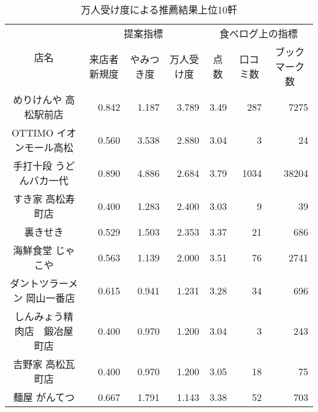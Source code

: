 \begin{table}[H]
\centering
\caption{万人受け度による推薦結果上位10軒}
\label{table:scrutiny:acceptability}
\small
\begin{tabular}{|c|r|r|r|r|r|r|}
\hline
\multirow{2}{*}{店名} & \multicolumn{3}{c|}{提案指標} & \multicolumn{3}{c|}{食べログ上の指標} \\ \cline{2-7} 
 & \multicolumn{1}{c|}{来店者新規度} & \multicolumn{1}{c|}{やみつき度} & \multicolumn{1}{c|}{万人受け度} & \multicolumn{1}{c|}{点数} & \multicolumn{1}{c|}{口コミ数} & \multicolumn{1}{c|}{ブックマーク数} \\ \hline
めりけんや 高松駅前店 & 0.842 & 1.187 & 3.789 & 3.49 & 287 & 7275 \\ \hline
OTTIMO イオンモール高松 & 0.560 & 3.538 & 2.880 & 3.04 & 3 & 24 \\ \hline
手打十段 うどんバカ一代 & 0.890 & 4.886 & 2.684 & 3.79 & 1034 & 38204 \\ \hline
すき家 高松寿町店 & 0.400 & 1.283 & 2.400 & 3.03 & 9 & 39 \\ \hline
裏きせき & 0.529 & 1.503 & 2.353 & 3.37 & 21 & 686 \\ \hline
海鮮食堂 じゃこや & 0.563 & 1.139 & 2.000 & 3.51 & 76 & 2741 \\ \hline
ダントツラーメン 岡山一番店 & 0.615 & 0.941 & 1.231 & 3.28 & 34 & 696 \\ \hline
しんみょう精肉店　鍛冶屋町店 & 0.400 & 0.970 & 1.200 & 3.04 & 3 & 243 \\ \hline
吉野家 高松瓦町店 & 0.400 & 0.970 & 1.200 & 3.05 & 18 & 75 \\ \hline
麺屋 がんてつ & 0.667 & 1.791 & 1.143 & 3.38 & 52 & 703 \\ \hline
\end{tabular}
\end{table}
